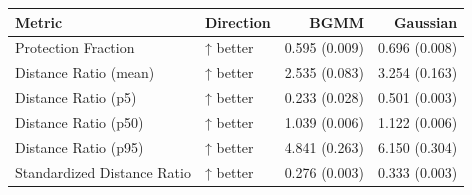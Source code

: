 \begin{tabular}{llrr}
\toprule
                     Metric & Direction &          BGMM &      Gaussian \\
\midrule
        Protection Fraction &  ↑ better & 0.595 (0.009) & 0.696 (0.008) \\
      Distance Ratio (mean) &  ↑ better & 2.535 (0.083) & 3.254 (0.163) \\
        Distance Ratio (p5) &  ↑ better & 0.233 (0.028) & 0.501 (0.003) \\
       Distance Ratio (p50) &  ↑ better & 1.039 (0.006) & 1.122 (0.006) \\
       Distance Ratio (p95) &  ↑ better & 4.841 (0.263) & 6.150 (0.304) \\
Standardized Distance Ratio &  ↑ better & 0.276 (0.003) & 0.333 (0.003) \\
\bottomrule
\end{tabular}
